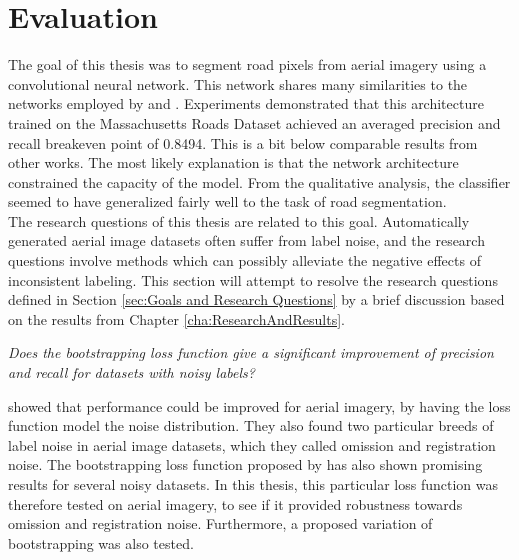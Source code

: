 \section{Evaluation}
\label{sec:SummaryDiscussion}
The goal of this thesis was to segment road pixels from aerial imagery using a convolutional neural network. This network shares many similarities to the networks employed by \cite{Mnih_aerial_images_noisy} and \citep{MnihThesis}. Experiments demonstrated that this architecture trained on the Massachusetts Roads Dataset achieved an averaged precision and recall breakeven point of 0.8494. This is a bit below comparable results from other works. The most likely explanation is that the network architecture constrained the capacity of the model. From the qualitative analysis, the classifier seemed to have generalized fairly well to the task of road segmentation.\\

 The research questions of this thesis are related to this goal. Automatically generated aerial image datasets often suffer from label noise, and the research questions involve methods which can possibly alleviate the negative effects of inconsistent labeling. This section will attempt to resolve the research questions defined in Section \ref{sec:Goals and Research Questions} by a brief discussion based on the results from Chapter \ref{cha:ResearchAndResults}.
 
\begin{description}[ style=nextline, leftmargin=1.5em, rightmargin=1.5em]
\item[Research question 1:]{\it Does the bootstrapping loss function give a significant improvement of precision and recall for datasets with noisy labels?}
\end{description}

\cite{Mnih_aerial_images_noisy} showed that performance could be improved for aerial imagery, by having the loss function model the noise distribution. They also found two particular breeds of label noise in aerial image datasets, which they called omission and registration noise. The bootstrapping loss function proposed by \cite{Reed_noisy_labels_bootstrapping} has also shown promising results for several noisy datasets. In this thesis, this particular loss function was therefore tested on aerial imagery, to see if it provided robustness towards omission and registration noise. Furthermore, a proposed variation of bootstrapping was also tested.\\

